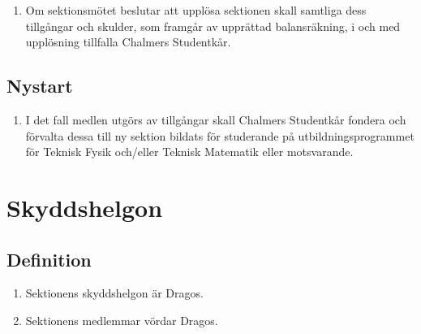 \documentclass[11pt,a4paper]{article}
\begin{document}
\begin{enumerate}[\thesubsection .1]

  \item Om sektionsmötet beslutar att upplösa sektionen skall samtliga
  dess tillgångar och skulder, som framgår av upprättad balansräkning,
  i och med upplösning tillfalla Chalmers Studentkår.

\end{enumerate}

\subsection{Nystart}

\begin{enumerate}[\thesubsection .1]

  \item I det fall medlen utgörs av tillgångar skall Chalmers Studentkår fondera och förvalta dessa till ny sektion bildats för studerande på utbildningsprogrammet för Teknisk Fysik och/eller Teknisk Matematik eller motsvarande.

\end{enumerate}

\newpage
\section{Skyddshelgon}

\subsection{Definition}

\begin{enumerate}[\thesubsection .1]

  \item Sektionens skyddshelgon är Dragos.

  \item Sektionens medlemmar vördar Dragos.

\end{enumerate}





\end{document}
